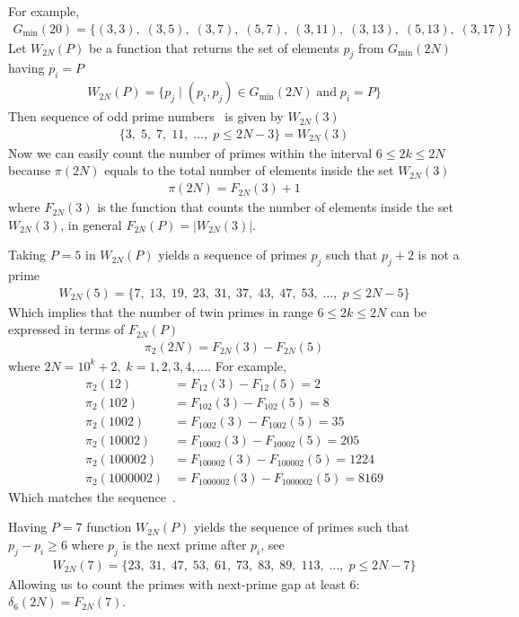 For example,
\begin{align*}
    G_{\min}(20) = \{
    (3,3),\;
    (3,5),\;
    (3,7),\;
    (5,7),\;
    (3,11),\;
    (3,13),\;
    (5,13),\;
    (3,17)
    \}
\end{align*}
Let $W_{2N}(P)$ be a function that returns the set of elements $p_j$ from $G_{\min} (2N)$ having $p_i=P$
\begin{align*}
    W_{2N}(P) = \{p_j \mid (p_i, p_j) \in G_{\min} (2N) \; \mathrm{and} \; p_i = P \}
\end{align*}
Then sequence of odd prime numbers~\cite{oeis:A065091} is given by $W_{2N}(3)$
\begin{align*}
    \{ 3, \; 5, \; 7, \; 11, \; \dots, \; p \leq 2N - 3\} = W_{2N}(3)
\end{align*}
Now we can easily count the number of primes within the interval $6 \leq 2k \leq 2N$ because $\pi(2N)$ equals to
the total number of elements inside the set $W_{2N}(3)$
\begin{align*}
    \pi(2N) = F_{2N}(3) + 1
\end{align*}
where $F_{2N}(3)$ is the function that counts the number of elements inside the set $W_{2N}(3)$,
in general $F_{2N}(P) = |W_{2N}(3)|$.

Taking $P=5$ in $W_{2N}(P)$ yields a sequence of primes $p_j$ such that $p_j+2$ is not a prime~\cite{oeis:A049591}
\begin{align*}
    W_{2N}(5) = \{ 7, \; 13, \; 19, \; 23, \; 31, \; 37, \; 43, \; 47, \; 53, \; \dots, \;  p \leq 2N - 5 \}
\end{align*}
Which implies that the number of twin primes in range $6 \leq 2k \leq 2N$ can be expressed in terms of $F_{2N}(P)$
\begin{align*}
    \pi_2 (2N) = F_{2N}(3) - F_{2N}(5)
\end{align*}
where $2N=10^k+2, \; k=1,2,3,4,\dots$.
For example,
\begin{align*}
    \pi_2 (12) &= F_{12}(3) - F_{12}(5) = 2 \\
    \pi_2 (102) &= F_{102}(3) - F_{102}(5) = 8 \\
    \pi_2 (1002) &= F_{1002}(3) - F_{1002}(5) = 35 \\
    \pi_2 (10002) &= F_{10002}(3) - F_{10002}(5) = 205 \\
    \pi_2 (100002) &= F_{100002}(3) - F_{100002}(5) = 1224 \\
    \pi_2 (1000002) &= F_{1000002}(3) - F_{1000002}(5) = 8169
\end{align*}
Which matches the sequence~\cite{oeis_A007508}.

Having $P=7$ function $W_{2N}(P)$ yields the sequence of primes such that $p_j-p_i \geq 6$
where $p_j$ is the next prime after $p_i$, see~\cite{oeis:A124582}
\begin{align*}
    W_{2N}(7) = \{ 23, \; 31, \;  47, \; 53, \; 61, \;  73, \; 83, \; 89, \; 113, \; \dots, \; p \leq 2N-7 \}
\end{align*}
Allowing us to count the primes with next-prime gap at least 6: $\delta_6(2N) = F_{2N}(7)$.
